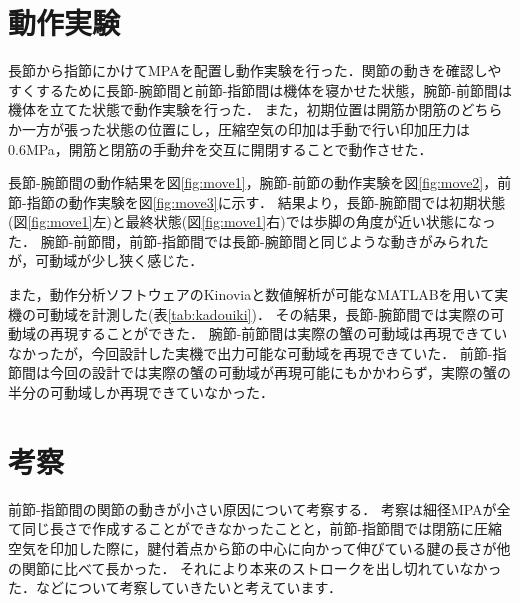\documentclass{jarticle}
\begin{document}
\section{動作実験}

長節から指節にかけてMPAを配置し動作実験を行った．関節の動きを確認しやすくするために長節-腕節間と前節-指節間は機体を寝かせた状態，腕節-前節間は機体を立てた状態で動作実験を行った．
また，初期位置は開筋か閉筋のどちらか一方が張った状態の位置にし，圧縮空気の印加は手動で行い印加圧力は0.6MPa，開筋と閉筋の手動弁を交互に開閉することで動作させた．

長節-腕節間の動作結果を図\ref{fig:move1}，腕節-前節の動作実験を図\ref{fig:move2}，前節-指節の動作実験を図\ref{fig:move3}に示す．
結果より，長節-腕節間では初期状態(図\ref{fig:move1}左)と最終状態(図\ref{fig:move1}右)では歩脚の角度が近い状態になった．
腕節-前節間，前節-指節間では長節-腕節間と同じような動きがみられたが，可動域が少し狭く感じた．

また，動作分析ソフトウェアのKinoviaと数値解析が可能なMATLABを用いて実機の可動域を計測した(表\ref{tab:kadouiki})．
その結果，長節-腕節間では実際の可動域の再現することができた．
腕節-前節間は実際の蟹の可動域は再現できていなかったが，今回設計した実機で出力可能な可動域を再現できていた．
前節-指節間は今回の設計では実際の蟹の可動域が再現可能にもかかわらず，実際の蟹の半分の可動域しか再現できていなかった．
\vspace*{-2mm}
\section{考察}

前節-指節間の関節の動きが小さい原因について考察する．
考察は細径MPAが全て同じ長さで作成することができなかったことと，前節-指節間では閉筋に圧縮空気を印加した際に，腱付着点から節の中心に向かって伸びている腱の長さが他の関節に比べて長かった．
それにより本来のストロークを出し切れていなかった．などについて考察していきたいと考えています．
\end{document}
